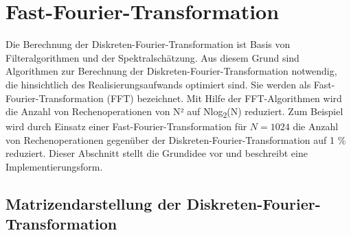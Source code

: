\section{Fast-Fourier-Transformation}\label{sec:10.5}

Die Berechnung der Diskreten-Fourier-Transformation ist Basis von Filteralgorithmen und der Spektralschätzung. Aus diesem Grund sind Algorithmen zur Berechnung der Diskreten-Fourier-Transformation notwendig, die hinsichtlich des Realisierungsaufwands optimiert sind. Sie werden als Fast-Fourier-Transformation (FFT) bezeichnet. Mit Hilfe der FFT-Algorithmen wird die Anzahl von Rechenoperationen von N² auf Nlog\textsubscript{2}(N) reduziert. Zum Beispiel wird durch Einsatz einer Fast-Fourier-Transformation für \(N = 1024\) die Anzahl von Rechenoperationen gegenüber der Diskreten-Fourier-Transformation auf 1 \% reduziert. Dieser Abschnitt stellt die Grundidee vor und beschreibt eine Implementierungsform.

\subsection{Matrizendarstellung der Diskreten-Fourier-Transformation}\label{sec:matrizendarstellung-der-diskreten-fourier-transformation}

